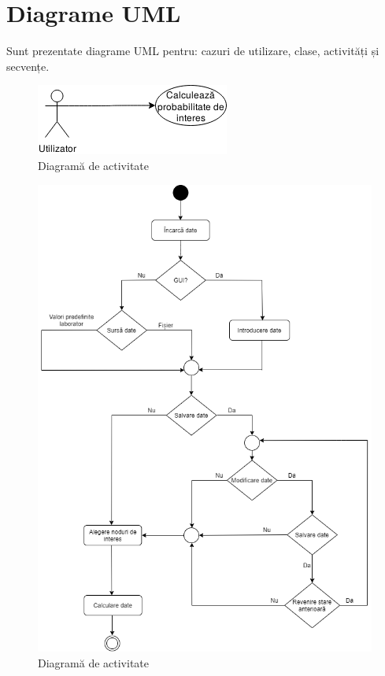 \documentclass[12pt]{article}
\begin{document}
\section{Diagrame UML}
Sunt prezentate diagrame UML pentru: cazuri de utilizare, clase, activități și secvențe.
\begin{figure}[H]
	\centering
	\includegraphics{img/useCaseDiagram.png}
	\caption{Diagramă de activitate}
\end{figure}
\begin{figure}[H]
	\centering
	\includegraphics[width=\linewidth]{img/diagrama-activitate.png}
	\caption{Diagramă de activitate}
\end{figure}
\end{document}
